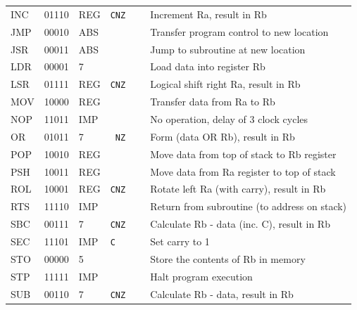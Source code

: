 \documentclass{article}
\begin{document}
\begin{tabular}{ | m{1cm} m{1cm} R{1cm} R{1cm} m{0.25cm} m{7.5cm} | }
    INC & 01110 &  REG & \verb|CNZ | & & Increment Ra, result in Rb \\
    JMP & 00010 &  ABS &             & & Transfer program control to new location \\
    JSR & 00011 &  ABS &             & & Jump to subroutine at new location \\
    LDR & 00001 &    7 &             & & Load data into register Rb \\
    LSR & 01111 &  REG & \verb|CNZ | & & Logical shift right Ra, result in Rb \\
    MOV & 10000 &  REG &             & & Transfer data from Ra to Rb \\
    NOP & 11011 &  IMP &             & & No operation, delay of 3 clock cycles \\
    OR  & 01011 &    7 & \verb| NZ | & & Form (data OR Rb), result in Rb \\
    POP & 10010 &  REG &             & & Move data from top of stack to Rb register \\
    PSH & 10011 &  REG &             & & Move data from Ra register to top of stack \\
    ROL & 10001 &  REG & \verb|CNZ | & & Rotate left Ra (with carry), result in Rb \\
    RTS & 11110 &  IMP &             & & Return from subroutine (to address on stack) \\
    SBC & 00111 &    7 & \verb|CNZ | & & Calculate Rb - data (inc. C), result in Rb \\
    SEC & 11101 &  IMP & \verb|C   | & & Set carry to 1 \\
    STO & 00000 &    5 &             & & Store the contents of Rb in memory \\
    STP & 11111 &  IMP &             & & Halt program execution \\
    SUB & 00110 &    7 & \verb|CNZ | & & Calculate Rb - data, result in Rb \\
    \hline
\end{tabular}

\normalsize
\end{document}
